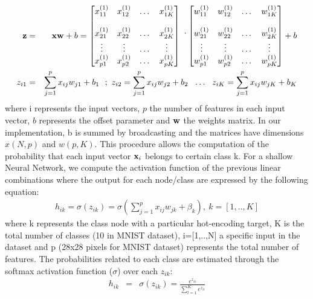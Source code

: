\documentclass{article}
\begin{document}
\begin{eqnarray}
\bold{z} &=& \bold{x}  \bold{w} + b = 
\begin{bmatrix}
x_{11}^{(1)} & x_{12}^{(1)} &  \dots & x_{1K}^{(1)} \\ \\
x_{21}^{(1)} & x_{22}^{(1)} & \dots & x_{2K}^{(1)} \\
\vdots & \vdots & \dots & \vdots \\
x_{p1}^{(1)} & x_{p2}^{(1)} & \dots & x_{pK}^{(1)}
\end{bmatrix} ~\dot~
\begin{bmatrix}
w_{11}^{(1)} & w_{12}^{(1)} &  \dots & w_{1K}^{(1)} \\ \\
w_{21}^{(1)} & w_{22}^{(1)} & \dots & w_{2K}^{(1)} \\
\vdots & \vdots & \dots & \vdots \\
w_{p1}^{(1)} & w_{p2}^{(1)} & \dots & w_{pK}^{(1)}
\end{bmatrix}  + b \\
z_{i1}&=&\sum_{j=1}^{p} x_{ij} w_{j1} +b_{1}~~;~z_{i2}=\sum_{j=1}^{p} x_{ij} w_{j2} +b_{2} ~~ \dots ~~
z_{iK}=\sum_{j=1}^{p} x_{ij} w_{jK} +b_{K}
\end{eqnarray}
where i represents the input vectors, $p$ the number of features in each input vector, $b$ represents the  offset parameter and $\bold{w}$ the weights matrix. In our implementation, b is summed by broadcasting and the matrices have dimensions $x(N,p)$ and $w(p,K)$. This procedure allows the computation of the probability that each input vector $\bold{x}_i$ belongs to certain class k. For a shallow Neural Network, we compute the activation function of the previous linear combinations where the output for each node/class are expressed by the following equation:
\begin{eqnarray}
h_{ik}=\sigma(z_{ik})=\sigma(\sum_{j=1}^{p} x_{ij} w_{jk}+\beta_{k} ),~k=[1,..,K]
\end{eqnarray}
where k represents the class node with a particular hot-encoding target, K is the total number of classes (10 in MNIST dataset), i=[1,..,N] a specific input in the dataset and p (28x28 pixels for MNIST dataset) represents the total number of features. The probabilities related to each class are estimated through the softmax activation function ($\sigma$) over each $z_{ik}$: 
\begin{eqnarray}
h_{ik}&=&\sigma(z_{ik})=\frac{e^{z_{ik}}}{\sum_{l=1}^{K} e^{z_{il}}}
\label{softmax}
\end{eqnarray}
\end{document}

